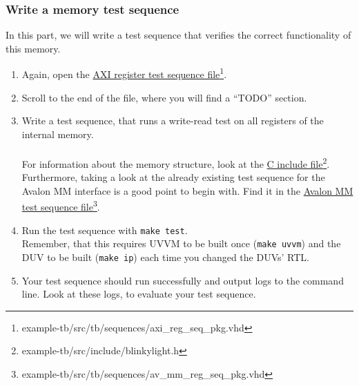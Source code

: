 \subsubsection{Write a memory test sequence}

In this part, we will write a test sequence that verifies the correct functionality of this memory.

\begin{enumerate}
      \item Again, open the \href{../../example-tb/src/tb/sequences/axi\_reg\_seq\_pkg.vhd} {AXI register test sequence file}\footnote{example-tb/src/tb/sequences/axi\_reg\_seq\_pkg.vhd}.
      \item Scroll to the end of the file, where you will find a ``TODO'' section.
      \item Write a test sequence, that runs a write-read test on all registers of the internal memory. \\
            \\
            For information about the memory structure, look at the \href{example-tb/src/include/blinkylight.h}{C include file}\footnote{example-tb/src/include/blinkylight.h}.\\
            Furthermore, taking a look at the already existing test sequence for the Avalon MM interface is a good point to begin with. Find it in the \href{example-tb/src/tb/sequences/av\_mm\_reg\_seq\_pkg.vhd}{Avalon MM test sequence file}\footnote{example-tb/src/tb/sequences/av\_mm\_reg\_seq\_pkg.vhd}.\\

      \item Run the test sequence with \texttt{make test}.\\
            Remember, that this requires UVVM to be built once (\texttt{make uvvm}) and the DUV to be built (\texttt{make ip}) each time you changed the DUVs' RTL.

      \item Your test sequence should run successfully and output logs to the command line. Look at these logs, to evaluate your test sequence.
\end{enumerate}
